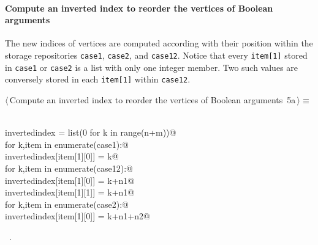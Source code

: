 \documentclass[11pt,oneside]{article}	%
\begin{document}
\paragraph{Compute an inverted index to reorder the vertices of Boolean arguments}
The new indices of vertices are computed according with their position within the storage repositories \texttt{case1}, \texttt{case2}, and \texttt{case12}. Notice that every \texttt{item[1]} stored in \texttt{case1} or \texttt{case2} is a list with only one integer member. Two such values are conversely stored in each \texttt{item[1]} within \texttt{case12}.
\begin{flushleft} \small \label{scrap7}
\protect{}$\langle\,$Compute an inverted index to reorder the vertices of Boolean arguments\nobreak\ {\footnotesize 5a}$\,\rangle\equiv$
\vspace{-1ex}
\begin{list}{}{} \item
\mbox{}\verb@@\\
\mbox{}\verb@   invertedindex = list(0 for k in range(n+m))@\\
\mbox{}\verb@   for k,item in enumerate(case1):@\\
\mbox{}\verb@      invertedindex[item[1][0]] = k@\\
\mbox{}\verb@   for k,item in enumerate(case12):@\\
\mbox{}\verb@      invertedindex[item[1][0]] = k+n1@\\
\mbox{}\verb@      invertedindex[item[1][1]] = k+n1@\\
\mbox{}\verb@   for k,item in enumerate(case2):@\\
\mbox{}\verb@      invertedindex[item[1][0]] = k+n1+n2@\\
\mbox{}\verb@@{\NWsep}
\end{list}
\vspace{-1ex}
\footnotesize\addtolength{\baselineskip}{-1ex}
\begin{list}{}{\setlength{\itemsep}{-\parsep}\setlength{\itemindent}{-\leftmargin}}
\item \NWtxtMacroRefIn\ .
\end{list}
\end{flushleft}

\end{document}
